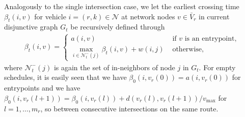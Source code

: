 \documentclass[a4paper]{article}
\theoremstyle{definition}
\theoremstyle{plain}
\begin{document}
%


Analogously to the single intersection case, we let the earliest crossing time
$\beta_{t}(i, v)$ for vehicle $i = (r,k) \in \mathcal{N}$ at network nodes
$v \in \bar{V}_{r}$ in current disjunctive graph $G_{t}$ be recursively
defined through
\begin{align*}
  \beta_{t}(i, v) =
  \begin{cases}
  a(i, v) & \text{ if $v$ is an entrypoint}, \\
  \max_{i \in \mathcal{N}_{t}^{-}(j)} \beta_{t}(i, v) + w(i, j) & \text{ otherwise},
  \end{cases}
\end{align*}
where $\mathcal{N}_{t}^{-}(j)$ is again the set of in-neighbors of node $j$ in
$G_{t}$.
%
For empty schedules, it is easily seen that we have
$\beta_{0}(i, v_{r}(0)) = a(i, v_{r}(0))$ for entrypoints and we have
$\beta_{0}(i, v_{r}(l + 1)) = \beta_{0}(i, v_{r}(l)) + d(v_{r}(l), v_{r}(l+1)) / v_{\max}$
for $l=1,\dots, m_{r}$, so between consecutive intersections on the same route.
\end{document}
